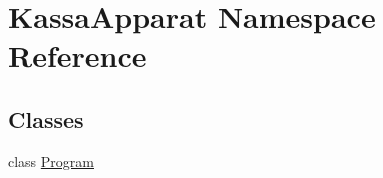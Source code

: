 \hypertarget{namespace_kassa_apparat}{}\section{Kassa\+Apparat Namespace Reference}
\label{namespace_kassa_apparat}
\subsection*{Classes}
\begin{DoxyCompactItemize}
\item 
class \mbox{\hyperlink{class_kassa_apparat_1_1_program}{Program}}
\end{DoxyCompactItemize}
